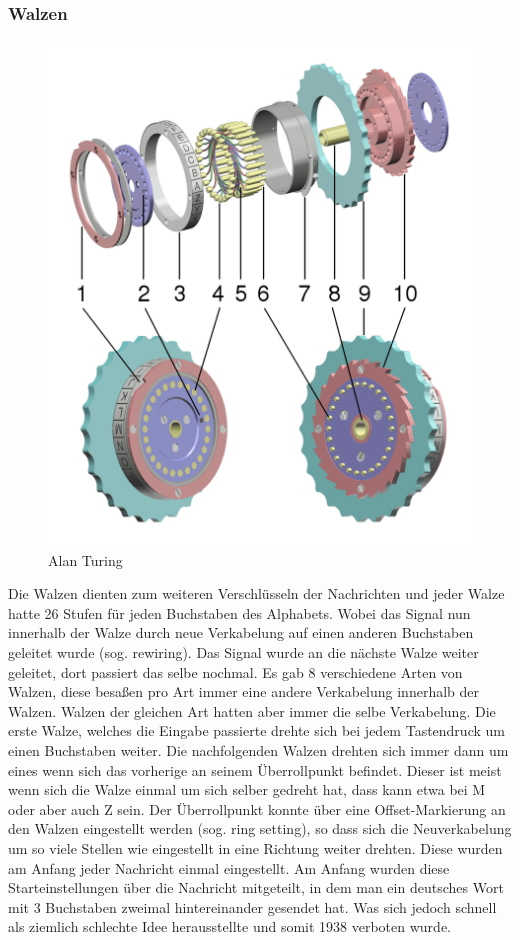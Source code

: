 \subsubsection{Walzen}
\label{sec:rader}
\begin{figure}

\includegraphics[scale=0.15]{Enigma_rotor_exploded_view.png}
\caption{Alan Turing}
\label{fig:rotorex}
\end{figure}
Die Walzen dienten zum weiteren Verschlüsseln der Nachrichten und jeder Walze hatte 26 Stufen für jeden Buchstaben des Alphabets. Wobei das Signal nun innerhalb der Walze durch neue Verkabelung auf einen anderen Buchstaben geleitet wurde (sog. rewiring). Das Signal wurde an die nächste Walze weiter geleitet, dort passiert das selbe nochmal. Es gab 8 verschiedene Arten von Walzen, diese besaßen pro Art immer eine andere Verkabelung innerhalb der Walzen. Walzen der gleichen Art hatten aber immer die selbe Verkabelung. Die erste Walze, welches die Eingabe passierte drehte sich bei jedem Tastendruck um einen Buchstaben weiter. Die nachfolgenden Walzen drehten sich immer dann um eines wenn sich das vorherige an seinem Überrollpunkt befindet. Dieser ist meist wenn sich die Walze einmal um sich selber gedreht hat, dass kann etwa bei M oder aber auch Z sein. Der Überrollpunkt konnte über eine Offset-Markierung an den Walzen eingestellt werden (sog. ring setting), so dass sich die Neuverkabelung um so viele Stellen wie eingestellt in eine Richtung weiter drehten. Diese wurden am Anfang jeder Nachricht einmal eingestellt. Am Anfang wurden diese Starteinstellungen über die Nachricht mitgeteilt, in dem man ein deutsches Wort mit 3 Buchstaben zweimal hintereinander gesendet hat. Was sich jedoch schnell als ziemlich schlechte Idee herausstellte und somit 1938 verboten wurde.

